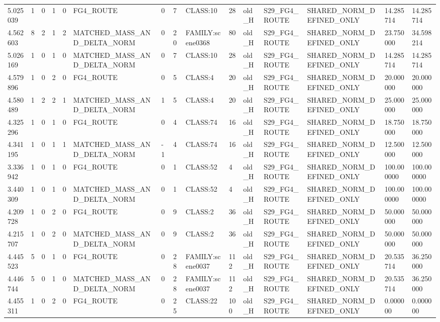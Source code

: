 \begin{tabular}{lllllllllllllll}
5.025039 & 1 & 0 & 1 & 0 & FG4\_ROUTE & 0 & 7 & CLASS:10 & 28 & old\_H & S29\_FG4\_ROUTE & SHARED\_NORM\_DEFINED\_ONLY & 14.285714 & 14.285714 \\
4.562603 & 8 & 2 & 1 & 2 & MATCHED\_MASS\_AND\_DELTA\_NORM & 0 & 20 & FAMILY:scene0368 & 80 & old\_H & S29\_FG4\_ROUTE & SHARED\_NORM\_DEFINED\_ONLY & 23.750000 & 34.598214 \\
5.026169 & 1 & 0 & 1 & 0 & MATCHED\_MASS\_AND\_DELTA\_NORM & 0 & 7 & CLASS:10 & 28 & old\_H & S29\_FG4\_ROUTE & SHARED\_NORM\_DEFINED\_ONLY & 14.285714 & 14.285714 \\
4.579896 & 1 & 0 & 2 & 0 & FG4\_ROUTE & 0 & 5 & CLASS:4 & 20 & old\_H & S29\_FG4\_ROUTE & SHARED\_NORM\_DEFINED\_ONLY & 20.000000 & 20.000000 \\
4.580489 & 1 & 2 & 2 & 1 & MATCHED\_MASS\_AND\_DELTA\_NORM & 1 & 5 & CLASS:4 & 20 & old\_H & S29\_FG4\_ROUTE & SHARED\_NORM\_DEFINED\_ONLY & 25.000000 & 25.000000 \\
4.325296 & 1 & 0 & 1 & 0 & FG4\_ROUTE & 0 & 4 & CLASS:74 & 16 & old\_H & S29\_FG4\_ROUTE & SHARED\_NORM\_DEFINED\_ONLY & 18.750000 & 18.750000 \\
4.341195 & 1 & 0 & 1 & 1 & MATCHED\_MASS\_AND\_DELTA\_NORM & -1 & 4 & CLASS:74 & 16 & old\_H & S29\_FG4\_ROUTE & SHARED\_NORM\_DEFINED\_ONLY & 12.500000 & 12.500000 \\
3.336942 & 1 & 0 & 1 & 0 & FG4\_ROUTE & 0 & 1 & CLASS:52 & 4 & old\_H & S29\_FG4\_ROUTE & SHARED\_NORM\_DEFINED\_ONLY & 100.000000 & 100.000000 \\
3.440309 & 1 & 0 & 1 & 0 & MATCHED\_MASS\_AND\_DELTA\_NORM & 0 & 1 & CLASS:52 & 4 & old\_H & S29\_FG4\_ROUTE & SHARED\_NORM\_DEFINED\_ONLY & 100.000000 & 100.000000 \\
4.209728 & 1 & 0 & 2 & 0 & FG4\_ROUTE & 0 & 9 & CLASS:2 & 36 & old\_H & S29\_FG4\_ROUTE & SHARED\_NORM\_DEFINED\_ONLY & 50.000000 & 50.000000 \\
4.215707 & 1 & 0 & 2 & 0 & MATCHED\_MASS\_AND\_DELTA\_NORM & 0 & 9 & CLASS:2 & 36 & old\_H & S29\_FG4\_ROUTE & SHARED\_NORM\_DEFINED\_ONLY & 50.000000 & 50.000000 \\
4.445523 & 5 & 0 & 1 & 0 & FG4\_ROUTE & 0 & 28 & FAMILY:scene0037 & 112 & old\_H & S29\_FG4\_ROUTE & SHARED\_NORM\_DEFINED\_ONLY & 20.535714 & 36.250000 \\
4.446744 & 5 & 0 & 1 & 0 & MATCHED\_MASS\_AND\_DELTA\_NORM & 0 & 28 & FAMILY:scene0037 & 112 & old\_H & S29\_FG4\_ROUTE & SHARED\_NORM\_DEFINED\_ONLY & 20.535714 & 36.250000 \\
4.455311 & 1 & 0 & 2 & 0 & FG4\_ROUTE & 0 & 25 & CLASS:22 & 100 & old\_H & S29\_FG4\_ROUTE & SHARED\_NORM\_DEFINED\_ONLY & 0.000000 & 0.000000 \\

\end{tabular}
